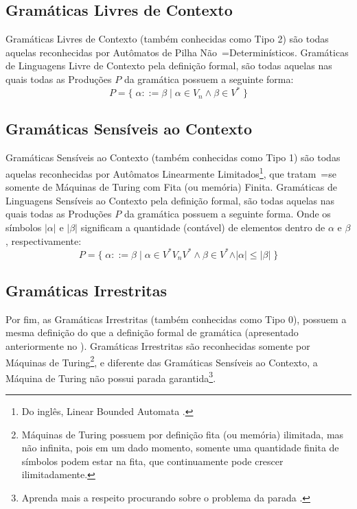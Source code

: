 \subsection{Gramáticas Livres de Contexto}

Gramáticas Livres de Contexto (também conhecidas como Tipo 2) \cite{hopcroftBook} são todas aquelas reconhecidas por Autômatos de Pilha Não~=Determinísticos.
Gramáticas de Linguagens Livre de Contexto pela definição formal,
são todas aquelas nas quais todas as Produções $P$ da gramática possuem a seguinte forma:
$$ P = \{\; \alpha ::= \beta \;|\; \alpha \in V_n \land \beta \in V^* \;\} $$


\subsection{Gramáticas Sensíveis ao Contexto}

Gramáticas Sensíveis ao Contexto (também conhecidas como Tipo 1) são todas aquelas reconhecidas por Autômatos Linearmente Limitados\footnote{
Do inglês,
Linear Bounded Automata \cite{fundamentalsOfTheoreticalComputerScience}.
},
que tratam~=se somente de Máquinas de Turing \cite{sipserBook} com Fita (ou memória) Finita.
Gramáticas de Linguagens Sensíveis ao Contexto pela definição formal,
são todas aquelas nas quais todas as Produções $P$ da gramática possuem a seguinte forma.
Onde os símbolos $\vert\alpha\vert$ e
$\vert\beta\vert$ significam a quantidade (contável) de elementos dentro de $\alpha$ e
$\beta$,
respectivamente:
$$ P = \{\; \alpha ::= \beta \;|\; \alpha \in V^* V_n V^* \land \beta \in V^*
            \land \vert\alpha\vert \leq \vert\beta\vert \;\} $$


\subsection{Gramáticas Irrestritas}

Por fim,
as Gramáticas Irrestritas (também conhecidas como Tipo 0),
possuem a mesma definição do que a definição formal de gramática (apresentado anteriormente no
).
Gramáticas Irrestritas são reconhecidas somente por Máquinas de Turing\footnote{
Máquinas de Turing possuem por definição fita (ou memória) ilimitada,
mas não infinita,
pois em um dado momento,
somente uma quantidade finita de símbolos podem estar na fita,
que continuamente pode crescer ilimitadamente.
},
e diferente das Gramáticas Sensíveis ao Contexto,
a Máquina de Turing não possui parada garantida\footnote{
Aprenda mais a respeito procurando sobre o problema da parada .
}.

